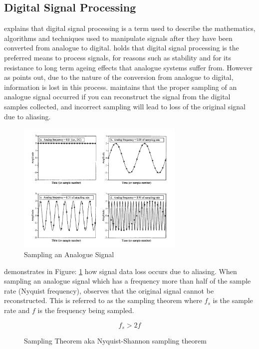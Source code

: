 \documentclass[runningheads,a4paper]{llncs}
\begin{document}
\subsection*{Digital Signal Processing}
\cite{smith-03-a} explains that digital signal processing is a term used to describe the mathematics, algorithms and techniques used to manipulate signals after they have been converted from analogue to digital. \cite{freidt-13} holds that digital signal processing is the preferred means to process signals, for reasons such as stability and for its resistance to long term ageing effects that analogue systems suffer from. However as \cite{smith-03-b} points out, due to the nature of the conversion from analogue to digital, information is lost in this process. \cite{smith-03-b} maintains that the proper sampling of an analogue signal occurred if you can reconstruct the signal from the digital samples collected, and incorrect sampling will lead to loss of the original signal due to aliasing.

%
\begin{figure}[here]
\centering
\includegraphics[width=8cm]{images/44}
\caption{Sampling an Analogue Signal \citep{smith-03-b}}
\label{fig:smith_sample_theorem_2003}
\end{figure}
%

\cite{smith-03-b} demonstrates in Figure: \ref{fig:smith_sample_theorem_2003} how signal data loss occurs due to aliasing. When sampling an analogue signal which has a frequency more than half of the sample rate (Nyquist frequency), \cite{smith-03-b} observes that the original signal cannot be reconstructed. This is referred to as the sampling theorem \citep{smith-03-b} where $f_s$ is the sample rate and $f$ is the frequency being sampled.

%
\begin{figure}[here]
  \centering
  \begin{equation}  	
    f_s > 2f
  \end{equation}
  \caption{Sampling Theorem aka Nyquist-Shannon sampling theorem \citep{smith-03-b}}
  \label{fig:nyquist-shannon-sample-theorem}
\end{figure}
%
\end{document}
